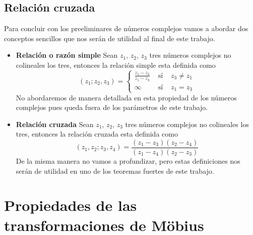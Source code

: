 \documentclass{matematicasud}
\begin{document}
\subsection{Relación cruzada}
Para concluir con los preeliminares de números complejos vamos a abordar dos conceptos sencillos que nos serán de utilidad al final de este trabajo.
\begin{itemize}
    \item  \textbf{Relación o razón simple}
    Sean $z_1$, $z_2$, $z_3$ tres números complejos no colineales los tres, entonces la relación simple esta definida como
    \begin{equation}
        (z_1;z_2,z_3) = \left\{
        \begin{array}{lcc}
           \frac{z_1-z_2}{z_1-z_3}  & \text{ sí } & z_3 \neq z_1  \\
             \infty & \text{ sí } & z_1=z_3
        \end{array}
        \right.
        \label{eq:(34)}
    \end{equation}
    No abordaremos de manera detallada en esta propiedad de los números complejos pues queda fuera de los parámetros de este trabajo.
    \item \textbf{Relación cruzada}
    Sean $z_1$, $z_2$, $z_3$ tres números complejos no colineales los tres, entonces la relación cruzada esta definida como
    \begin{equation}
        (z_1,z_2;z_3,z_4) = \frac{(z_1-z_3)(z_2-z_4)}{(z_1-z_4)(z_2-z_3)}
        \label{eq:(35)}
    \end{equation}
    De la misma manera no vamos a profundizar, pero estas definiciones nos serán de utilidad en uno de los teoremas fuertes de este trabajo.
\end{itemize}

\newpage

\section{Propiedades de las transformaciones de Möbius}\label{cap:3}
\end{document}
